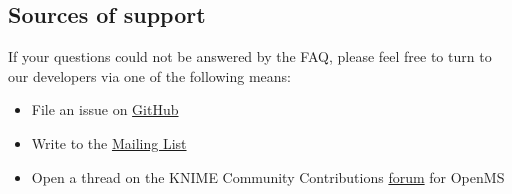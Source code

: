 \subsection{Sources of support}
If your questions could not be answered by the FAQ, please feel free to turn to our developers via one of the following means:
\begin{itemize}
\item File an issue on \href{https://github.com/OpenMS/OpenMS/issues}{GitHub}
\item Write to the \href{mailto:open-ms-developers@lists.sourceforge.net}{Mailing List}
\item Open a thread on the KNIME Community Contributions \href{https://tech.knime.org/forum/openms}{forum} for OpenMS
\end{itemize}